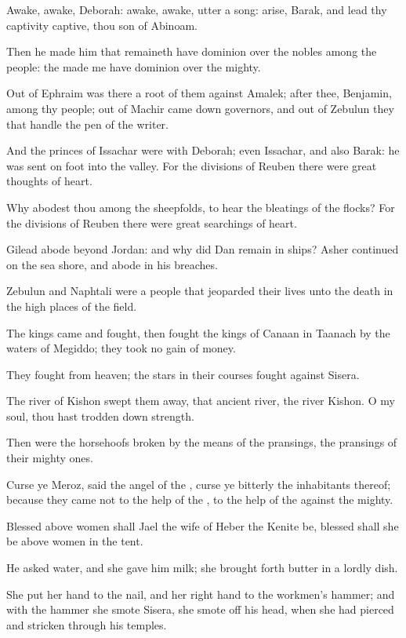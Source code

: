 \verse Awake, awake, Deborah: awake, awake, utter a song: arise, Barak, and lead thy captivity captive, thou son of Abinoam.

\verse Then he made him that remaineth have dominion over the nobles among the people: the \LORD made me have dominion over the mighty.

\verse Out of Ephraim was there a root of them against Amalek; after thee, Benjamin, among thy people; out of Machir came down governors, and out of Zebulun they that handle the pen of the writer.

\verse And the princes of Issachar were with Deborah; even Issachar, and also Barak: he was sent on foot into the valley. For the divisions of Reuben there were great thoughts of heart.

\verse Why abodest thou among the sheepfolds, to hear the bleatings of the flocks? For the divisions of Reuben there were great searchings of heart.

\verse Gilead abode beyond Jordan: and why did Dan remain in ships?  Asher continued on the sea shore, and abode in his breaches.

\verse Zebulun and Naphtali were a people that jeoparded their lives unto the death in the high places of the field.

\verse The kings came and fought, then fought the kings of Canaan in Taanach by the waters of Megiddo; they took no gain of money.

\verse They fought from heaven; the stars in their courses fought against Sisera.

\verse The river of Kishon swept them away, that ancient river, the river Kishon. O my soul, thou hast trodden down strength.

\verse Then were the horsehoofs broken by the means of the pransings, the pransings of their mighty ones.

\verse Curse ye Meroz, said the angel of the \LORD, curse ye bitterly the inhabitants thereof; because they came not to the help of the \LORD, to the help of the \LORD against the mighty.

\verse Blessed above women shall Jael the wife of Heber the Kenite be, blessed shall she be above women in the tent.

\verse He asked water, and she gave him milk; she brought forth butter in a lordly dish.

\verse She put her hand to the nail, and her right hand to the workmen's hammer; and with the hammer she smote Sisera, she smote off his head, when she had pierced and stricken through his temples.

